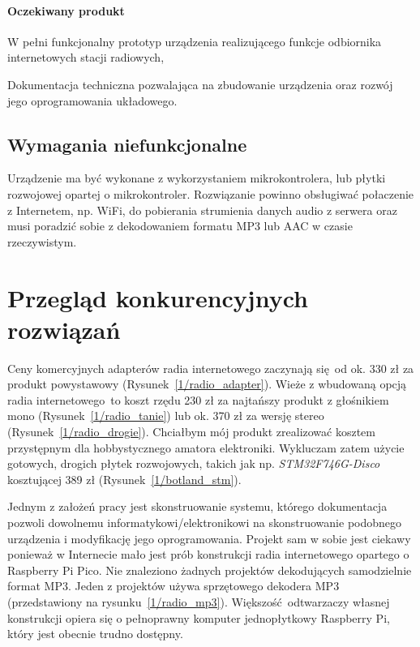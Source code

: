 \documentclass[12pt]{report}
\let\tempone\itemize
\let\temptwo\enditemize
\renewenvironment{itemize}{\tempone\setlength{\itemsep}{0cm}}{\temptwo}
\begin{document}
			\paragraph{Oczekiwany produkt}
			\begin{itemize}
				\item W pełni funkcjonalny prototyp urządzenia realizującego funkcje odbiornika internetowych stacji radiowych,
				\item Dokumentacja techniczna pozwalająca na zbudowanie urządzenia oraz rozwój jego oprogramowania układowego.
			\end{itemize}
		
		\subsection{Wymagania niefunkcjonalne}
			Urządzenie ma być wykonane z wykorzystaniem mikrokontrolera, lub płytki rozwojowej opartej o mikrokontroler. Rozwiązanie powinno obsługiwać połaczenie z Internetem, np. WiFi, do pobierania strumienia danych audio z serwera oraz musi poradzić sobie z dekodowaniem formatu MP3 lub AAC w czasie rzeczywistym.
		
	\section{Przegląd konkurencyjnych rozwiązań}
		Ceny komercyjnych adapterów radia internetowego zaczynają się od ok. 330 zł za produkt powystawowy (Rysunek~\ref{1/radio_adapter}). Wieże z wbudowaną opcją radia internetowego to koszt rzędu 230 zł za najtańszy produkt z głośnikiem mono (Rysunek~\ref{1/radio_tanie}) lub ok. 370 zł za wersję stereo (Rysunek~\ref{1/radio_drogie}). Chciałbym mój produkt zrealizować kosztem przystępnym dla hobbystycznego amatora elektroniki. Wykluczam zatem użycie gotowych, drogich płytek rozwojowych, takich jak np. \textit{STM32F746G-Disco} kosztującej 389 zł (Rysunek~\ref{1/botland_stm}).
		
		Jednym z założeń pracy jest skonstruowanie systemu, którego dokumentacja pozwoli dowolnemu informatykowi/elektronikowi na skonstruowanie podobnego urządzenia i modyfikację jego oprogramowania. Projekt sam w sobie jest ciekawy ponieważ w Internecie mało jest prób konstrukcji radia internetowego opartego o Raspberry Pi Pico. Nie znaleziono żadnych projektów dekodujących samodzielnie format MP3.  Jeden z projektów\textsuperscript{\cite{radio_pico1}} używa sprzętowego dekodera MP3 (przedstawiony na rysunku~\ref{1/radio_mp3}). Większość odtwarzaczy własnej konstrukcji opiera się o pełnoprawny komputer jednopłytkowy Raspberry Pi, który jest obecnie trudno dostępny.
		
\end{document}
